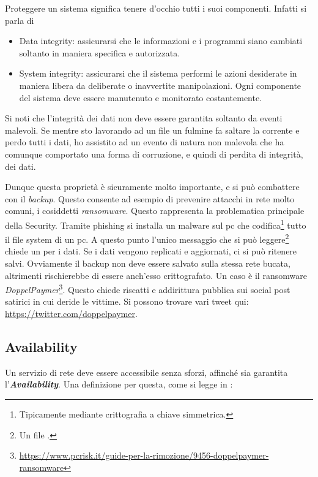 \documentclass[14pt]{extreport}
\begin{document}
\begin{center}
    


\textit{}\cite{rfc}
\end{center}


Proteggere un sistema significa tenere d'occhio tutti i suoi componenti. Infatti si parla\cite{stallings} di

\begin{itemize}
    \item Data integrity: assicurarsi che le informazioni e i programmi siano cambiati soltanto in maniera specifica e autorizzata.
    \item System integrity: assicurarsi che il sistema performi le azioni desiderate in maniera libera da deliberate o inavvertite manipolazioni. Ogni componente del sistema deve essere manutenuto e monitorato costantemente.
\end{itemize}


Si noti che l'integrità dei dati non deve essere garantita soltanto da eventi malevoli. Se mentre sto lavorando ad un file un fulmine fa saltare la corrente e perdo tutti i dati, ho assistito ad un evento di natura non malevola che ha comunque comportato una forma di corruzione, e quindi di perdita di integrità, dei dati.


Dunque questa proprietà è sicuramente molto importante, e si può combattere con il \textit{backup}. Questo consente ad esempio di prevenire attacchi in rete molto comuni, i cosiddetti \textit{ransomware}. Questo rappresenta la problematica principale della Security. Tramite phishing si installa un malware sul pc che codifica\footnote{Tipicamente mediante crittografia a chiave simmetrica.} tutto il file system di un pc. A questo punto l'unico messaggio che si può leggere\footnote{Un file .} chiede un  per i dati. Se i dati vengono replicati e aggiornati, ci si può ritenere salvi. Ovviamente il backup non deve essere salvato sulla stessa rete bucata, altrimenti rischierebbe di essere anch'esso crittografato. Un caso è il ransomware \textit{DoppelPaymer}\footnote{\url{https://www.pcrisk.it/guide-per-la-rimozione/9456-doppelpaymer-ransomware}}. Questo chiede riscatti e addirittura pubblica sui social post satirici in cui deride le vittime. Si possono trovare vari tweet qui: \url{https://twitter.com/doppelpaymer}.


\subsection{Availability}
Un servizio di rete deve essere accessibile senza sforzi, affinché sia garantita l'\textbf{\textit{Availability}}. Una definizione per questa, come si legge in \cite{rfc}:
\end{document}
